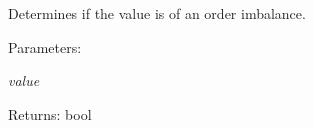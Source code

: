 Determines if the value is of an order imbalance. 

\begin{Desc}
\item[Parameters:]
\begin{description}
\item[{\em value}]\end{description}
\end{Desc}
\begin{Desc}
\item[Returns:]bool \end{Desc}
